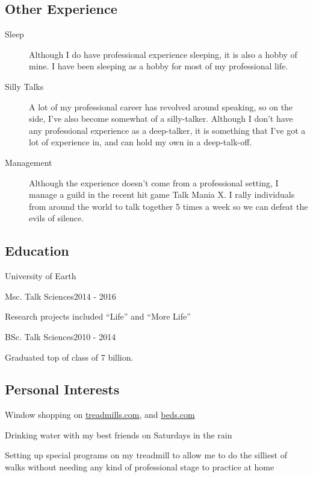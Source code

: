 \documentclass[pdftex,letterpaper,10pt]{article}
\begin{document}
\subsection*{Other Experience}
\begin{description}
    \item[Sleep] Although I do have professional experience sleeping, it is also a hobby of mine.
        I have been sleeping as a hobby for most of my professional life.
    \item[Silly Talks] A lot of my professional career has revolved around speaking, so on the side, I've also become somewhat of a silly-talker.
        Although I don't have any professional experience as a deep-talker, it is something that I've got a lot of experience in, and can hold my own in a deep-talk-off.
    \item[Management] Although the experience doesn't come from a professional setting, I manage a guild in the recent hit game Talk Mania X.
        I rally individuals from around the world to talk together 5 times a week so we can defeat the evils of silence.
\end{description}
%
\subsection*{Education}
\begin{school}{University of Earth}
    \begin{degree}{Msc. Talk Sciences}{2014 - 2016}
        \item Research projects included ``Life'' and ``More Life''
    \end{degree}
    \begin{degree}{BSc. Talk Sciences}{2010 - 2014}
        \item Graduated top of class of 7 billion.
    \end{degree}
\end{school}
%
\subsection*{Personal Interests}
\begin{itemize*}[itemjoin=\hspace{8pt},label={\(\bullet\)\hspace{2pt}}]
    \item Window shopping on \href{http://treadmills.com}{treadmills.com}, and \href{http://beds.com}{beds.com}
    \item Drinking water with my best friends on Saturdays in the rain
    \item Setting up special programs on my treadmill to allow me to do the silliest of walks without needing any kind of professional stage to practice at home
\end{itemize*}
%
\end{document}
